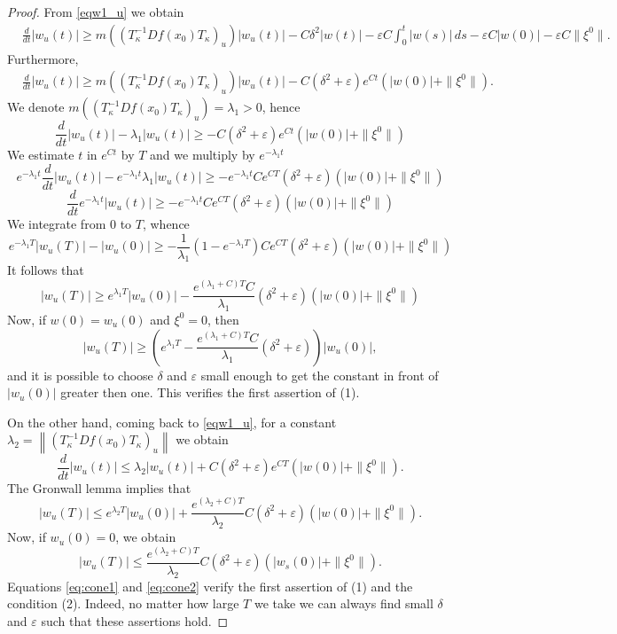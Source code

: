 \documentclass[11pt, leqno]{amsart}
\theoremstyle{definition}
\begin{document}
	\begin{proof}
From \eqref{eqw1_u} we obtain
\begin{align}
	& \frac{d}{dt}|w_u(t)| \geq  m\left((T_\kappa^{-1}D f(x_0) T_\kappa)_u\right) |w_u(t)| - C\delta^2|w(t)|  - \varepsilon C\int_0^t |w(s)|\, ds  - \varepsilon C |w(0)| - \varepsilon C\|\xi^0\|.
\end{align}
Furthermore,
\begin{align}
	& \frac{d}{dt}|w_u(t)| \geq  m\left((T_\kappa^{-1}D f(x_0) T_\kappa)_u\right) |w_u(t)| - C(\delta^2+\varepsilon)e^{Ct}(|w(0)|+\|\xi^0\|).
\end{align}
We denote $m\left((T_\kappa^{-1}D f(x_0) T_\kappa)_u\right) = \lambda_1>0$, hence
$$
\frac{d}{dt}|w_u(t)| - \lambda_1 |w_u(t)| \geq   - C(\delta^2+\varepsilon)e^{Ct}(|w(0)|+\|\xi^0\|)
$$
We estimate $t$ in $e^{Ct}$ by $T$ and we multiply by $e^{-\lambda_1 t}$
$$
e^{-\lambda_1 t}\frac{d}{dt}|w_u(t)| - e^{-\lambda_1 t}\lambda_1 |w_u(t)| \geq   - e^{-\lambda_1 t} Ce^{CT}(\delta^2+\varepsilon)(|w(0)|+\|\xi^0\|)
$$
$$
\frac{d}{dt}e^{-\lambda_1 t}|w_u(t)|\geq   - e^{-\lambda_1 t} Ce^{CT}(\delta^2+\varepsilon)(|w(0)|+\|\xi^0\|)
$$
We integrate from $0$ to $T$, whence
$$
e^{-\lambda_1T}|w_u(T)| - |w_u(0)| \geq  -\frac{1}{\lambda_1}(1-e^{-\lambda_1T}) Ce^{CT}(\delta^2+\varepsilon)(|w(0)|+\|\xi^0\|)
$$
It follows that
$$
|w_u(T)|  \geq  e^{\lambda_1 T}|w_u(0)|  - \frac{e^{(\lambda_1+C)T} C}{\lambda_1}(\delta^2+\varepsilon)(|w(0)|+\|\xi^0\|)
$$
Now, if $w(0) = w_u(0)$ and $\xi^0=0$, then
\begin{equation}\label{eq:cone1}
|w_u(T)|  \geq  \left(e^{\lambda_1 T}-\frac{e^{(\lambda_1+C)T} C}{\lambda_1}(\delta^2+\varepsilon)\right)|w_u(0)|,
\end{equation}
and it is possible to choose $\delta$ and $\varepsilon$ small enough to get the constant in front of $|w_u(0)|$ greater then one. This verifies the first assertion of (1).

On the other hand, coming back to \eqref{eqw1_u}, for a constant $\lambda_2= \left\|(T_\kappa^{-1}D f(x_0) T_\kappa)_u\right\|$ we obtain
$$
\frac{d}{dt}|w_u(t)| \leq \lambda_2 |w_u(t)|+C(\delta^2+\varepsilon)e^{CT}(|w(0)|+\|\xi^0\|).
$$
The Gronwall lemma implies that
$$
|w_u(T)| \leq e^{\lambda_2 T}|w_u(0)|+\frac{e^{(\lambda_2+C)T}}{\lambda_2}C(\delta^2+\varepsilon)(|w(0)|+\|\xi^0\|).
$$
Now, if $w_u(0) = 0$, we obtain
\begin{equation}\label{eq:cone2}
|w_u(T)| \leq \frac{e^{(\lambda_2+C)T}}{\lambda_2}C(\delta^2+\varepsilon)(|w_s(0)|+\|\xi^0\|).
\end{equation}
Equations \eqref{eq:cone1} and \eqref{eq:cone2}
 verify the first assertion of (1) and the condition (2). Indeed, no matter how large $T$ we take we can always find small $\delta$ and $\varepsilon$ such that these assertions hold.
\end{proof}
\end{document}
